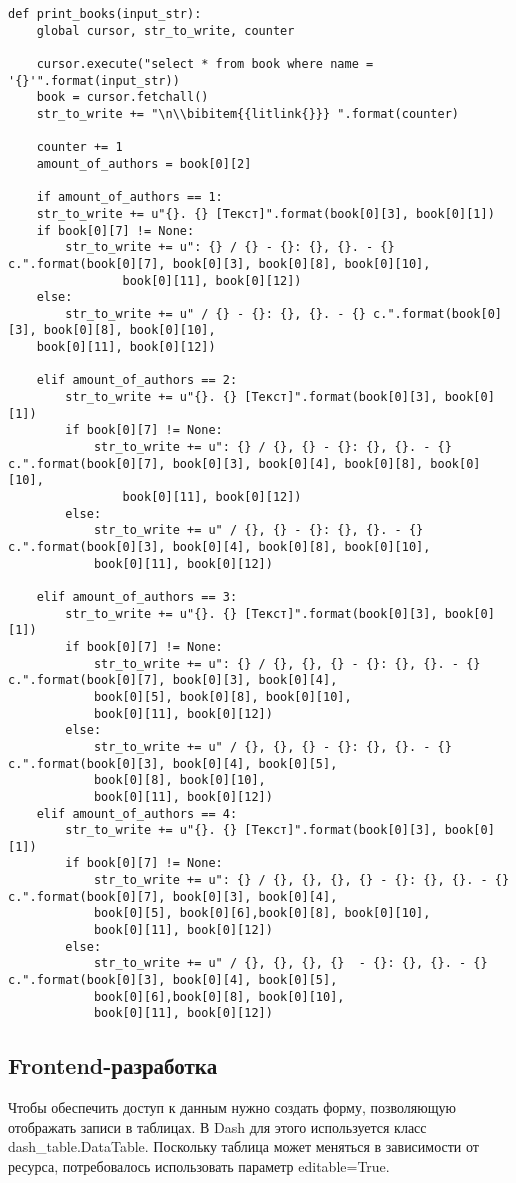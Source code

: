 \begin{lstlisting}[label=some-code2, caption=Обработка данных]
def print_books(input_str):
	global cursor, str_to_write, counter

	cursor.execute("select * from book where name = 	'{}'".format(input_str))
	book = cursor.fetchall()
	str_to_write += "\n\\bibitem{{litlink{}}} ".format(counter)

	counter += 1
	amount_of_authors = book[0][2]

	if amount_of_authors == 1:
	str_to_write += u"{}. {} [Текст]".format(book[0][3], book[0][1])
	if book[0][7] != None:
		str_to_write += u": {} / {} - {}: {}, {}. - {} с.".format(book[0][7], book[0][3], book[0][8], book[0][10],
				book[0][11], book[0][12])
	else:
		str_to_write += u" / {} - {}: {}, {}. - {} с.".format(book[0][3], book[0][8], book[0][10],
	book[0][11], book[0][12])

	elif amount_of_authors == 2:
		str_to_write += u"{}. {} [Текст]".format(book[0][3], book[0][1])
		if book[0][7] != None:
			str_to_write += u": {} / {}, {} - {}: {}, {}. - {} с.".format(book[0][7], book[0][3], book[0][4], book[0][8], book[0][10],
				book[0][11], book[0][12])
		else:
			str_to_write += u" / {}, {} - {}: {}, {}. - {} с.".format(book[0][3], book[0][4], book[0][8], book[0][10],
			book[0][11], book[0][12])

	elif amount_of_authors == 3:
		str_to_write += u"{}. {} [Текст]".format(book[0][3], book[0][1])
		if book[0][7] != None:
			str_to_write += u": {} / {}, {}, {} - {}: {}, {}. - {} 		с.".format(book[0][7], book[0][3], book[0][4],
			book[0][5], book[0][8], book[0][10],
			book[0][11], book[0][12])
		else:
			str_to_write += u" / {}, {}, {} - {}: {}, {}. - {} с.".format(book[0][3], book[0][4], book[0][5],
			book[0][8], book[0][10],
			book[0][11], book[0][12])
	elif amount_of_authors == 4:
		str_to_write += u"{}. {} [Текст]".format(book[0][3], book[0][1])
		if book[0][7] != None:
			str_to_write += u": {} / {}, {}, {}, {} - {}: {}, {}. - {} с.".format(book[0][7], book[0][3], book[0][4],
			book[0][5], book[0][6],book[0][8], book[0][10],
			book[0][11], book[0][12])
		else:
			str_to_write += u" / {}, {}, {}, {}  - {}: {}, {}. - {} с.".format(book[0][3], book[0][4], book[0][5],
			book[0][6],book[0][8], book[0][10],
			book[0][11], book[0][12])

\end{lstlisting}
\subsection*{Frontend-разработка}%
Чтобы обеспечить доступ к данным нужно создать форму, позволяющую отображать записи в таблицах. В Dash для этого используется класс dash\_table.DataTable. Поскольку таблица может меняться в зависимости от ресурса, потребовалось использовать параметр editable=True.

